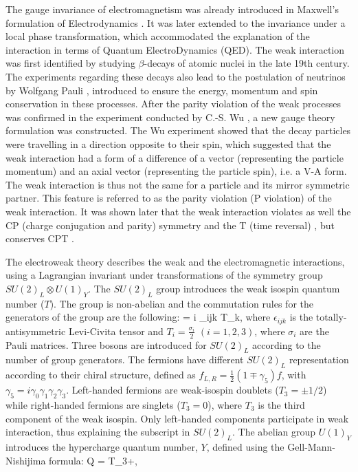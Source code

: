 The gauge invariance of electromagnetism was already introduced in Maxwell's formulation of Electrodynamics \cite{maxwell1873treatise}. It was later extended to the invariance under a local phase transformation, which accommodated the explanation of the interaction in terms of Quantum ElectroDynamics (QED). The weak interaction was first identified by studying $\beta$-decays of atomic nuclei in the late 19th century. The experiments regarding these decays also lead to the postulation of neutrinos by Wolfgang Pauli \cite{Pauli:83286}, introduced to ensure the energy, momentum and spin conservation in these processes. After the parity violation of the weak processes was confirmed in the experiment conducted by C.-S. Wu \cite{Wu:1957my}, a new gauge theory formulation was constructed. The Wu experiment showed that the decay particles were travelling in a direction opposite to their spin, which suggested that the weak interaction had a form of a difference of a vector (representing the particle momentum) and an axial vector (representing the particle spin), i.e. a V-A form. The weak interaction is thus not the same for a particle and its mirror symmetric partner. This feature is referred to as the parity violation (P violation) of the weak interaction. It was shown later that the weak interaction violates as well the CP (charge conjugation and parity) symmetry \cite{Wolfenstein:1964ks} and the T (time reversal) \cite{Lees:2012uka}, but conserves CPT \cite{Lee:1965js}.\par
The electroweak theory describes the weak and the electromagnetic interactions, using a Lagrangian invariant under transformations of the symmetry group $SU(2)_{L} \otimes U(1)_{Y}$. The $SU(2)_{L}$ group introduces the weak isospin quantum number ($T$). The group is non-abelian and the commutation rules for the generators of the group are the following:
\be
\left [T_i , T_j \right ] = i \epsilon_{ijk} T_k,
\ee
\noindent where $\epsilon_{ijk}$ is the totally-antisymmetric Levi-Civita tensor and $T_i=\frac{\sigma_i}{2}$ $(i=1,2,3)$, where $\sigma_i$ are the Pauli matrices. Three bosons are introduced for $SU(2)_{L}$ according to the number of group generators. The fermions have different $SU(2)_{L}$ representation according to their chiral structure, defined as $f_{L,R}=\frac{1}{2}(1\mp \gamma_{5})f$, with $\gamma_{5}= i \gamma_{0}\gamma_{1}\gamma_{2}\gamma_{3}$. Left-handed fermions are weak-isospin doublets ($T_{3}=\pm1/2$) while right-handed fermions are singlets ($T_{3}=0$), where $T_{3}$ is the third component of the weak isospin. Only left-handed components participate in weak interaction, thus explaining the subscript in $SU(2)_{L}$. The abelian group $U(1)_{Y}$ introduces the hypercharge quantum number, $Y$, defined using the Gell-Mann-Nishijima formula:
\be
Q = T_{3}+,
\ee

